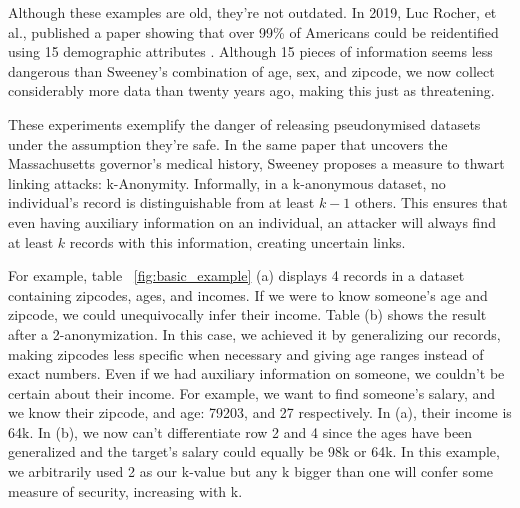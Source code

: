 Although these examples are old, they're not outdated. In 2019, Luc Rocher, et al., published a paper showing that over 99\% of Americans could be reidentified using 15 demographic attributes \cite{rocher_estimating_reid}. Although 15 pieces of information seems less dangerous than Sweeney's combination of age, sex, and zipcode, we now collect considerably more data than twenty years ago, making this just as threatening.


These experiments exemplify the danger of releasing pseudonymised datasets under the assumption they're safe. In the same paper that uncovers the Massachusetts governor's medical history, Sweeney proposes a measure to thwart linking attacks: k-Anonymity. Informally, in a k-anonymous dataset, no individual's record is distinguishable from at least $k-1$ others. This ensures that even having auxiliary information on an individual, an attacker will always find at least $k$ records with this information, creating uncertain links. 

 For example, table ~\ref{fig:basic_example} (a) displays 4 records in a dataset containing zipcodes, ages, and incomes. If we were to know someone's age and zipcode, we could unequivocally infer their income. Table (b) shows the result after a 2-anonymization. In this case, we achieved it by generalizing our records, making zipcodes less specific when necessary and giving age ranges instead of exact numbers. Even if we had auxiliary information on someone, we couldn't be certain about their income. For example, we want to find someone's salary, and we know their zipcode, and age: 79203, and 27 respectively. In (a), their income is 64k. In (b), we now can't differentiate row 2 and 4 since the ages have been generalized and the target's salary could equally be 98k or 64k. In this example, we arbitrarily used 2 as our k-value but any k bigger than one will confer some measure of security, increasing with k.

